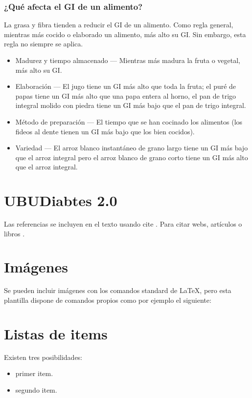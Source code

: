 \subsubsection{¿Qué afecta el GI de un alimento?}
La grasa y fibra tienden a reducir el GI de un alimento. Como regla general, mientras más cocido o elaborado un alimento, más alto su GI. Sin embargo, esta regla no siempre se aplica.
\begin{itemize}
	\item Madurez y tiempo almacenado — Mientras más madura la fruta o vegetal, más alto su GI.
	\item Elaboración — El jugo tiene un GI más alto que toda la fruta; el puré de papas tiene un GI más alto que una papa entera al horno, el pan de trigo integral molido con piedra tiene un GI más bajo que el pan de trigo integral.
	\item Método de preparación — El tiempo que se han cocinado los alimentos (los fideos al dente tienen un GI más bajo que los bien cocidos).
	\item Variedad — El arroz blanco instantáneo de grano largo tiene un GI más bajo que el arroz integral pero el arroz blanco de grano corto tiene un GI más alto que el arroz integral.
\end{itemize}

\section{UBUDiabtes 2.0}

Las referencias se incluyen en el texto usando cite \cite{wiki:latex}. Para citar webs, artículos o libros \cite{koza92}.


\section{Imágenes}

Se pueden incluir imágenes con los comandos standard de \LaTeX, pero esta plantilla dispone de comandos propios como por ejemplo el siguiente:




\section{Listas de items}

Existen tres posibilidades:

\begin{itemize}
	\item primer item.
	\item segundo item.
\end{itemize}

